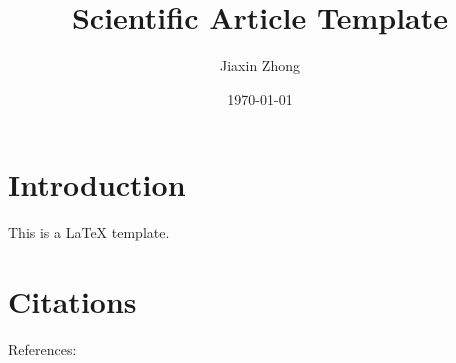 \documentclass{article}
\title{Scientific Article Template}
\author{Jiaxin Zhong}
\date{\today}
\begin{document}
\maketitle
\section{Introduction}
This is a \LaTeX{} template.

\section{Citations}
References: \cite{Zhong2020InsertionLossThin}




\end{document}
